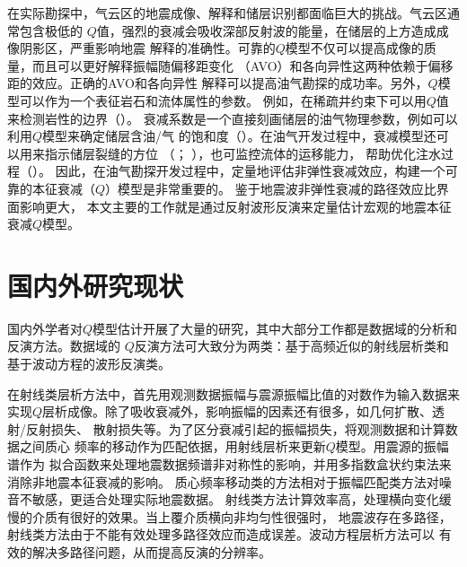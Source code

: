 在实际勘探中，气云区的地震成像、解释和储层识别都面临巨大的挑战。气云区通常包含极低的
$Q$值，强烈的衰减会吸收深部反射波的能量，在储层的上方造成成像阴影区，严重影响地震
解释的准确性。可靠的$Q$模型不仅可以提高成像的质量，而且可以更好解释振幅随偏移距变化
（AVO）和各向异性这两种依赖于偏移距的效应。正确的AVO和各向异性
解释可以提高油气勘探的成功率。另外，$Q$模型可以作为一个表征岩石和流体属性的参数。
例如，在稀疏井约束下可以用$Q$值来检测岩性的边界（）。
衰减系数是一个直接刻画储层的油气物理参数，例如可以利用$Q$模型来确定储层含油/气
的饱和度（）。在油气开发过程中，衰减模型还可以用来指示储层裂缝的方位
（； ），也可监控流体的运移能力，
帮助优化注水过程（）。
因此，在油气勘探开发过程中，定量地评估非弹性衰减效应，构建一个可靠的本征衰减（$Q$）模型是非常重要的。
鉴于地震波非弹性衰减的路径效应比界面影响更大，
本文主要的工作就是通过反射波形反演来定量估计宏观的地震本征衰减$Q$模型。

\vspace{1.2cm}
\section{国内外研究现状}
\vspace{0.4cm}

国内外学者对$Q$模型估计开展了大量的研究，其中大部分工作都是数据域的分析和反演方法。数据域的
$Q$反演方法可大致分为两类：基于高频近似的射线层析类和基于波动方程的波形反演类。

在射线类层析方法中，首先用观测数据振幅与震源振幅比值的对数作为输入数据来
实现$Q$层析成像。除了吸收衰减外，影响振幅的因素还有很多，如几何扩散、透射/反射损失、
散射损失等。为了区分衰减引起的振幅损失，将观测数据和计算数据之间质心
频率的移动作为匹配依据，用射线层析来更新$Q$模型。用震源的振幅谱作为
拟合函数来处理地震数据频谱非对称性的影响，并用多指数盒状约束法来消除非地震本征衰减的影响。
质心频率移动类的方法相对于振幅匹配类方法对噪音不敏感，更适合处理实际地震数据。
射线类方法计算效率高，处理横向变化缓慢的介质有很好的效果。当上覆介质横向非均匀性很强时，
地震波存在多路径，射线类方法由于不能有效处理多路径效应而造成误差。波动方程层析方法可以
有效的解决多路径问题，从而提高反演的分辨率。

